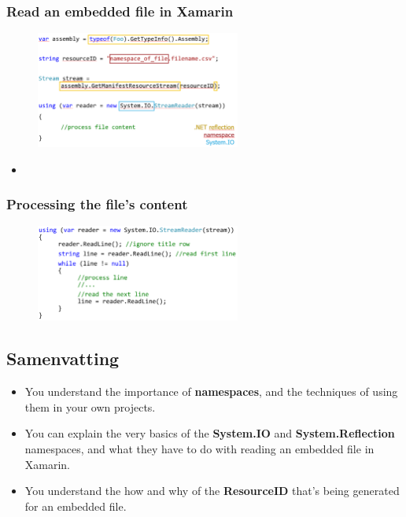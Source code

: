 \documentclass{article}
\newcommand{\bold}[1]{\textbf{#1}}
\begin{document}
\subsubsection{Read an embedded file in Xamarin}

\begin{figure}[H]
    \centering
    \includegraphics[width=0.6\textwidth]{embedded-files.png}
    \caption{}
\end{figure}

\begin{itemize}
    \item 
\end{itemize}

\subsubsection{Processing the file's content}

\begin{figure}[H]
    \centering
    \includegraphics[width=0.6\textwidth]{embedded-files2.png}
    \caption{}
\end{figure}

\subsection{Samenvatting}

\begin{itemize}
    \item You understand the importance of \bold{namespaces}, and the techniques of using them in your own projects.
    \item You can explain the very basics of the \bold{System.IO} and \bold{System.Reflection} namespaces, and what they have to do with reading an embedded file in Xamarin.
    \item You understand the how and why of the \bold{ResourceID} that’s being generated for an embedded file.
\end{itemize}
\end{document}
